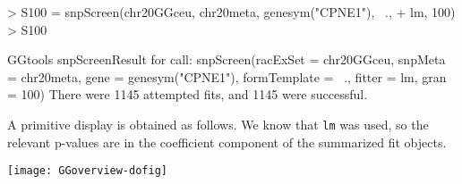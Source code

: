 \documentclass[12pt]{article}
\newcommand{\Rfunction}[1]{{\texttt{#1}}}
\begin{document}
\begin{Schunk}
\begin{Sinput}
> S100 = snpScreen(chr20GGceu, chr20meta, genesym("CPNE1"), ~., 
+     lm, 100)
> S100
\end{Sinput}
\begin{Soutput}
GGtools snpScreenResult for call:
snpScreen(racExSet = chr20GGceu, snpMeta = chr20meta, gene = genesym("CPNE1"), 
    formTemplate = ~., fitter = lm, gran = 100)
There were 1145 attempted fits,
and 1145 were successful.
\end{Soutput}
\end{Schunk}
A primitive display is obtained as follows.  We know that \texttt{lm}
was used, so the relevant p-values are in the coefficient component
of the summarized fit objects.
\begin{Schunk}
\end{Schunk}
\texttt{[image: GGoverview-dofig]}


\end{document}
